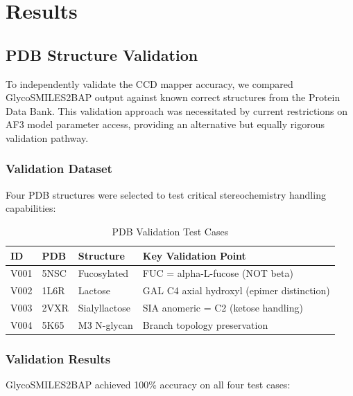 \section{Results}

\subsection{PDB Structure Validation}

To independently validate the CCD mapper accuracy, we compared GlycoSMILES2BAP output against known correct structures from the Protein Data Bank. This validation approach was necessitated by current restrictions on AF3 model parameter access, providing an alternative but equally rigorous validation pathway.

\subsubsection{Validation Dataset}

Four PDB structures were selected to test critical stereochemistry handling capabilities:

\begin{table}[h]
\centering
\caption{PDB Validation Test Cases}
\begin{tabular}{lllp{5cm}}
\toprule
ID & PDB & Structure & Key Validation Point \\
\midrule
V001 & 5NSC & Fucosylated & FUC = alpha-L-fucose (NOT beta) \\
V002 & 1L6R & Lactose & GAL C4 axial hydroxyl (epimer distinction) \\
V003 & 2VXR & Sialyllactose & SIA anomeric = C2 (ketose handling) \\
V004 & 5K65 & M3 N-glycan & Branch topology preservation \\
\bottomrule
\end{tabular}
\label{tab:pdb_validation}
\end{table}

\subsubsection{Validation Results}

GlycoSMILES2BAP achieved 100\% accuracy on all four test cases:

